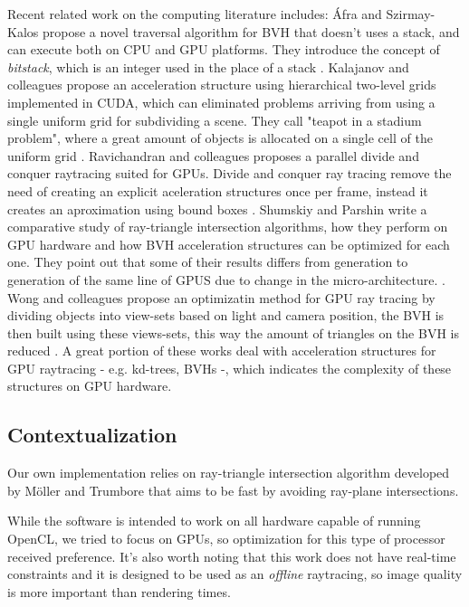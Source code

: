 \documentclass[a4paper]{sbgames}               %
\begin{document}
Recent related work on the computing literature includes: Áfra and
Szirmay-Kalos propose a novel traversal algorithm for BVH that doesn't
uses a stack, and can execute both on CPU and GPU platforms. They
introduce the concept of \emph{bitstack}, which is an integer used in
the place of a stack \cite{Afra}. Kalajanov and colleagues propose an
acceleration structure using hierarchical two-level grids implemented
in CUDA, which can eliminated problems arriving from using a single
uniform grid for subdividing a scene. They call "teapot in a stadium
problem", where a great amount of objects is allocated on a single
cell of the uniform grid \cite{Kalojanov}. Ravichandran and colleagues
proposes a parallel divide and conquer raytracing suited for
GPUs. Divide and conquer ray tracing remove the need of creating an
explicit aceleration structures once per frame, instead it creates an
aproximation using bound boxes \cite{Ravichandran}. Shumskiy and
Parshin write a comparative study of ray-triangle intersection
algorithms, how they perform on GPU hardware and how BVH acceleration
structures can be optimized for each one. They point out that some of
their results differs from generation to generation of the same line
of GPUS due to change in the micro-architecture.
\cite{Shumskiy}. Wong and colleagues propose an optimizatin method for
GPU ray tracing by dividing objects into view-sets based on light and
camera position, the BVH is then built using these views-sets, this
way the amount of triangles on the BVH is reduced \cite{Wong}. A great
portion of these works deal with acceleration structures for GPU
raytracing - e.g. kd-trees, BVHs -, which indicates the complexity of
these structures on GPU hardware.

\subsection{Contextualization}

Our own implementation relies on ray-triangle intersection algorithm
developed by Möller and Trumbore that aims to be fast by avoiding
ray-plane intersections\cite{moller}.

While the software is intended to work on all hardware capable of
running OpenCL, we tried to focus on GPUs, so optimization for this
type of processor received preference. It's also worth noting that
this work does not have real-time constraints and it is designed to be
used as an \emph{offline} raytracing, so image quality is more
important than rendering times.
\end{document}
